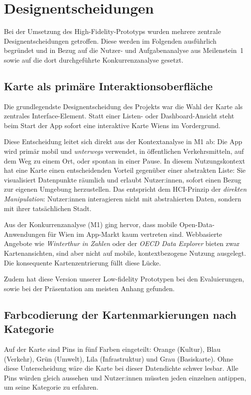 \section{Designentscheidungen}

Bei der Umsetzung des High-Fidelity-Prototyps wurden mehrere zentrale Designentscheidungen getroffen.
Diese werden im Folgenden ausführlich begründet und in Bezug auf die Nutzer- und Aufgabenanalyse aus Meilenstein~1
sowie auf die dort durchgeführte Konkurrenzanalyse gesetzt.

\subsection{Karte als primäre Interaktionsoberfläche}

Die grundlegendste Designentscheidung des Projekts war die Wahl der Karte als zentrales Interface-Element.
Statt einer Listen- oder Dashboard-Ansicht steht beim Start der App sofort eine interaktive Karte Wiens im Vordergrund.

Diese Entscheidung leitet sich direkt aus der Kontextanalyse in M1 ab:
Die App wird primär mobil und \textit{unterwegs} verwendet, in öffentlichen Verkehrsmitteln, auf dem Weg zu einem Ort, oder spontan in einer Pause.
In diesem Nutzungskontext hat eine Karte einen entscheidenden Vorteil gegenüber einer abstrakten Liste:
Sie visualisiert Datenpunkte räumlich und erlaubt Nutzer:innen, sofort einen Bezug zur eigenen Umgebung herzustellen.
Das entspricht dem HCI-Prinzip der \textit{direkten Manipulation}: Nutzer:innen interagieren nicht mit abstrahierten Daten,
sondern mit ihrer tatsächlichen Stadt.

Aus der Konkurrenzanalyse (M1) ging hervor, dass mobile Open-Data-Anwendungen für Wien im App-Markt kaum vertreten sind.
Webbasierte Angebote wie \textit{Winterthur in Zahlen} oder der \textit{OECD Data Explorer} bieten zwar Kartenansichten,
sind aber nicht auf mobile, kontextbezogene Nutzung ausgelegt.
Die konsequente Kartenzentrierung füllt diese Lücke.

Zudem hat diese Version unserer Low-fidelity Prototypen bei den Evaluierungen, sowie bei der Präsentation am meisten Anhang gefunden.

\subsection{Farbcodierung der Kartenmarkierungen nach Kategorie}

Auf der Karte sind Pins in fünf Farben eingeteilt: Orange (Kultur), Blau (Verkehr), Grün (Umwelt),
Lila (Infrastruktur) und Grau (Basiskarte).
Ohne diese Unterscheidung wäre die Karte bei dieser Datendichte schwer lesbar. Alle Pins würden gleich aussehen
und Nutzer:innen müssten jeden einzelnen antippen, um seine Kategorie zu erfahren.

